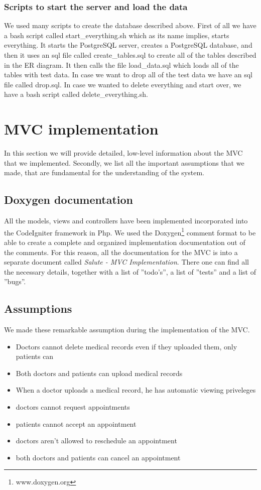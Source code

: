 \documentclass[12pt]{report}
\begin{document}
\begin{itemize}
\subsubsection{Scripts to start the server and load the data}
We used many scripts to create the database described above.  First of all we have a bash script called start\_everything.sh which as its name implies, starts everything.  It starts the PostgreSQL server, creates a PostgreSQL database, and then it uses an sql file called create\_tables.sql to create all of the tables described in the ER diagram.  It then calls the file load\_data.sql which loads all of the tables with test data.  In case we want to drop all of the test data we have an sql file called drop.sql.  In case we wanted to delete everything and start over, we have a bash script called delete\_everything.sh. 

\section{MVC implementation}
In this section we will provide detailed, low-level information about the MVC that we implemented. Secondly, we list all the important assumptions that we made, that are fundamental for the understanding of the system.

\subsection{Doxygen documentation}
All the models, views and controllers have been implemented incorporated into the CodeIgniter framework in Php. We used the Doxygen\footnote{www.doxygen.org} comment format to be able to create a complete and organized implementation documentation out of the comments. For this reason, all the documentation for the MVC is into a separate document called \emph{Salute - MVC Implementation}. There one can find all the necessary details, together with a list of ''todo's'', a list of ''tests'' and a list of ''bugs''.

\subsection{Assumptions}
We made these remarkable assumption during the implementation of the MVC.
\begin{itemize}
\item Doctors cannot delete medical records even if they uploaded them, only patients can
\item Both doctors and patients can upload medical records
\item When a doctor uploads a medical record, he has automatic viewing priveleges
\item doctors cannot request appointments
\item patients cannot accept an appointment
\item doctors aren't allowed to reschedule an appointment
\item both doctors and patients can cancel an appointment
\end{itemize}


\end{itemize}
\end{document}
